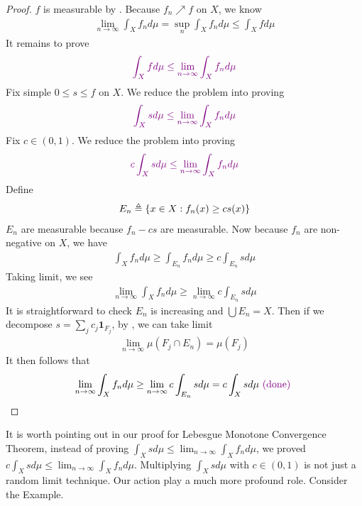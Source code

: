 \documentclass{report}
\begin{document}
\begin{proof}
$f$ is measurable by . Because  $f_n \nearrow f$ on $X$, we know 
\begin{align*}
 \lim_{n\to \infty}\int_X f_nd\mu = \sup_n \int_X f_nd\mu \leq \int_X fd\mu 
\end{align*}
It remains to prove 
\begin{align*}
\textcolor{violet}{\int_X fd\mu \leq \lim_{n\to \infty}\int_X f_nd\mu}
\end{align*}
Fix simple $0\leq s\leq f$ on $X$. We reduce the problem into proving 
\begin{align*}
  \textcolor{violet}{\int_X sd\mu \leq \lim_{n\to \infty}\int_X f_nd\mu}
\end{align*}
Fix $c \in (0,1)$. We reduce the problem into proving 
\begin{align*}
  \textcolor{violet}{c\int_X sd\mu \leq \lim_{n\to \infty}\int_X f_nd\mu}
\end{align*}
Define 
\begin{align*}
E_n \triangleq \{ x\in X: f_n(x)\geq cs(x) \}
\end{align*}
$E_n$ are measurable because $f_n-cs$ are measurable. Now because $f_n$ are non-negative on  $X$, we have 
\begin{align*}
\int_X f_n d\mu \geq \int_{E_n}f_n d\mu \geq c \int_{E_n} sd\mu
\end{align*}
Taking limit, we see
\begin{align*}
\lim_{n\to \infty} \int_X f_n d\mu \geq \lim_{n\to \infty} c \int_{E_n}sd\mu 
\end{align*}
It is straightforward to check $E_n$ is increasing and $\bigcup E_n =X$. Then if we decompose $s=\sum_{j} c_j \textbf{1}_{F_j}$, by , we can take limit 
\begin{align*}
\lim_{n\to \infty}\mu (F_j\cap E_n)=\mu (F_j)
\end{align*}
It then follows that 
\begin{align*}
\lim_{n\to \infty}\int_X f_nd\mu \geq \lim_{n\to \infty}c \int_{E_n}sd\mu= c\int_X sd\mu \textcolor{violet}{\text{ (done) }}
\end{align*}
\end{proof}
\begin{mdframed}
It is worth pointing out in our proof for Lebesgue Monotone Convergence Theorem, instead of proving $\int_X sd\mu \leq \lim_{n\to \infty}\int_X f_nd\mu$, we proved $c\int_X sd\mu \leq \lim_{n\to \infty}\int_X f_nd\mu$. Multiplying $\int_X sd\mu$ with $c\in (0,1)$ is not just a random limit technique. Our action play a much more profound role. Consider the Example.
\end{mdframed}
\end{document}
